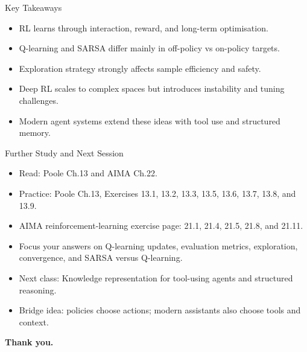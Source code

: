 \documentclass[aspectratio=169]{beamer}
\newcommand{\defaultdeckrefs}{AIMA4e Ch.22 pp.789--822; Poole3e Ch.13 pp.583--608}
\newcommand{\currentsliderefs}{\defaultdeckrefs}
\newcommand{\setslideref}[1]{\gdef\currentsliderefs{#1}}
\begin{document}
\setslideref{AIMA4e Ch.22 pp.789--822; Poole3e Ch.13 pp.583--608}
\begin{frame}{Key Takeaways}
\begin{itemize}
  \item RL learns through interaction, reward, and long-term optimisation.
  \item Q-learning and SARSA differ mainly in off-policy vs on-policy targets.
  \item Exploration strategy strongly affects sample efficiency and safety.
  \item Deep RL scales to complex spaces but introduces instability and tuning challenges.
  \item Modern agent systems extend these ideas with tool use and structured memory.
\end{itemize}
\end{frame}

\setslideref{AIMA4e Ch.22 pp.789--822; Poole3e Ch.13 pp.583--608}
\begin{frame}{Further Study and Next Session}
\begin{itemize}
  \item Read: Poole Ch.13 and AIMA Ch.22.
  \item Practice: Poole Ch.13, Exercises 13.1, 13.2, 13.3, 13.5, 13.6, 13.7, 13.8, and 13.9.
  \item AIMA reinforcement-learning exercise page: 21.1, 21.4, 21.5, 21.8, and 21.11.
  \item Focus your answers on Q-learning updates, evaluation metrics, exploration, convergence, and SARSA versus Q-learning.
  \item Next class: Knowledge representation for tool-using agents and structured reasoning.
  \item Bridge idea: policies choose actions; modern assistants also choose tools and context.
\end{itemize}
\vspace{0.6em}
\centering
\textbf{Thank you.}
\end{frame}
\end{document}

